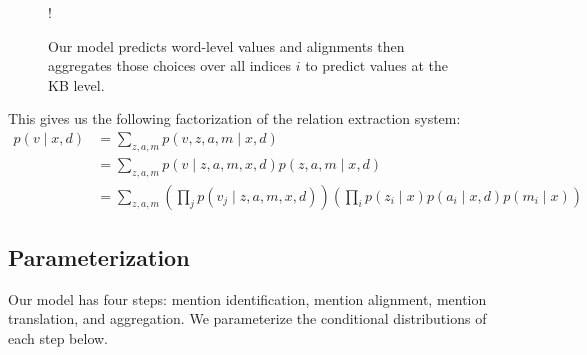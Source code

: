 \documentclass[12pt]{article}
\begin{document}
\begin{figure}[h]
\begin{center}
\resizebox {.3\columnwidth} {!} {
} %
\end{center}
\caption{Our model predicts word-level values and alignments
then aggregates those choices over all indices $i$ to
predict values at the KB level.
}
\label{fig:infmodel}
\end{figure}

This gives us the following factorization of the relation extraction system:
\begin{equation}
\label{eqn:prob}
\begin{aligned}
p(v \mid x,d) &= \sum_{z,a,m} p(v,z,a,m\mid x,d)\\
&= \sum_{z,a,m} p(v\mid z,a,m,x,d) p(z, a, m\mid x,d)\\
&= \sum_{z,a,m} \left(\prod_j p(v_j\mid z,a,m,x,d)\right)
\left(\prod_i p(z_i\mid x)p(a_i\mid x,d)p(m_i\mid x)\right)
\end{aligned}
\end{equation}

\subsection{Parameterization}
Our model has four steps: mention identification, mention alignment, 
mention translation, and aggregation.
We parameterize the conditional distributions of each step below.
\end{document}
